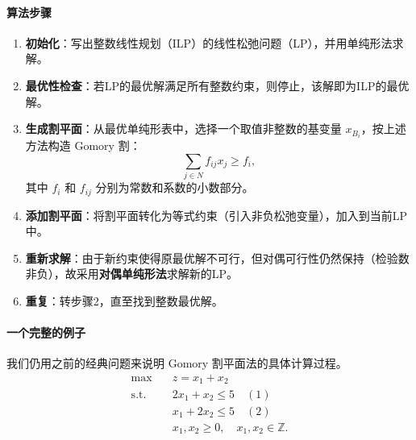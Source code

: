 \documentclass[12pt]{article}
\theoremstyle{plain}
\theoremstyle{definition}
\newcommand{\st}{\mathrel{\text{s.t.}}}
\begin{document}
\paragraph{算法步骤}
\begin{enumerate}
    \item \textbf{初始化}：写出整数线性规划（ILP）的线性松弛问题（LP），并用单纯形法求解。
    \item \textbf{最优性检查}：若LP的最优解满足所有整数约束，则停止，该解即为ILP的最优解。
    \item \textbf{生成割平面}：从最优单纯形表中，选择一个取值非整数的基变量 $x_{B_i}$，按上述方法构造 Gomory 割：
        \[
        \sum_{j \in N} f_{ij} x_j \ge f_i,
        \]
        其中 $f_i$ 和 $f_{ij}$ 分别为常数和系数的小数部分。
    \item \textbf{添加割平面}：将割平面转化为等式约束（引入非负松弛变量），加入到当前LP中。
    \item \textbf{重新求解}：由于新约束使得原最优解不可行，但对偶可行性仍然保持（检验数非负），故采用\textbf{对偶单纯形法}求解新的LP。
    \item \textbf{重复}：转步骤2，直至找到整数最优解。
\end{enumerate}

\paragraph{一个完整的例子}
我们仍用之前的经典问题来说明 Gomory 割平面法的具体计算过程。
\begin{align*}
    \max \quad & z = x_1 + x_2 \\
    \st \quad & 2x_1 + x_2 \le 5 \quad (1)\\
    & x_1 + 2x_2 \le 5 \quad (2)\\
    & x_1, x_2 \ge 0, \quad x_1, x_2 \in \mathbb{Z}.
\end{align*}
\end{document}
